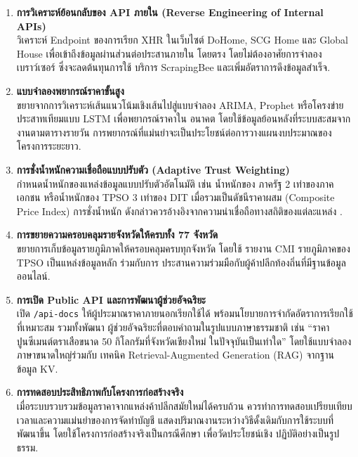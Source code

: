\begin{enumerate}[leftmargin=2em,itemsep=0.3em]
  \item \textbf{การวิเคราะห์ย้อนกลับของ API ภายใน (Reverse Engineering
        of Internal APIs)}\\
        วิเคราะห์ Endpoint ของการเรียก XHR ในเว็บไซต์ DoHome, SCG Home
        และ Global House เพื่อเข้าถึงข้อมูลผ่านส่วนต่อประสานภายใน
        โดยตรง โดยไม่ต้องอาศัยการจำลองเบราว์เซอร์ ซึ่งจะลดต้นทุนการใช้
        บริการ ScrapingBee และเพิ่มอัตราการดึงข้อมูลสำเร็จ.

  \item \textbf{แบบจำลองพยากรณ์ราคาขั้นสูง}\\
        ขยายจากการวิเคราะห์เส้นแนวโน้มเชิงเส้นไปสู่แบบจำลอง ARIMA,
        Prophet หรือโครงข่ายประสาทเทียมแบบ LSTM เพื่อพยากรณ์ราคาใน
        อนาคต โดยใช้ข้อมูลย้อนหลังที่ระบบสะสมจากงานตามตารางรายวัน
        การพยากรณ์ที่แม่นยำจะเป็นประโยชน์ต่อการวางแผนงบประมาณของ
        โครงการระยะยาว.

  \item \textbf{การชั่งน้ำหนักความเชื่อถือแบบปรับตัว (Adaptive Trust
        Weighting)}\\
        กำหนดน้ำหนักของแหล่งข้อมูลแบบปรับตัวอัตโนมัติ เช่น น้ำหนักของ
        ภาครัฐ 2 เท่าของภาคเอกชน หรือน้ำหนักของ TPSO 3 เท่าของ DIT
        เมื่อรวมเป็นดัชนีราคาผสม (Composite Price Index) การชั่งน้ำหนัก
        ดังกล่าวควรอ้างอิงจากความน่าเชื่อถือทางสถิติของแต่ละแหล่ง
        \cite{elmohr2022}.

  \item \textbf{การขยายความครอบคลุมรายจังหวัดให้ครบทั้ง 77 จังหวัด}\\
        ขยายการเก็บข้อมูลรายภูมิภาคให้ครอบคลุมครบทุกจังหวัด โดยใช้
        รายงาน CMI รายภูมิภาคของ TPSO เป็นแหล่งข้อมูลหลัก ร่วมกับการ
        ประสานความร่วมมือกับผู้ค้าปลีกท้องถิ่นที่มีฐานข้อมูลออนไลน์.

  \item \textbf{การเปิด Public API และการพัฒนาผู้ช่วยอัจฉริยะ}\\
        เปิด \texttt{/api-docs} ให้ผู้ประมาณราคาภายนอกเรียกใช้ได้
        พร้อมนโยบายการจำกัดอัตราการเรียกใช้ที่เหมาะสม รวมทั้งพัฒนา
        ผู้ช่วยอัจฉริยะที่ตอบคำถามในรูปแบบภาษาธรรมชาติ เช่น
        ``ราคาปูนซีเมนต์ตราเสือขนาด 50 กิโลกรัมที่จังหวัดเชียงใหม่
        ในปัจจุบันเป็นเท่าใด'' โดยใช้แบบจำลองภาษาขนาดใหญ่ร่วมกับ
        เทคนิค Retrieval-Augmented Generation (RAG) จากฐานข้อมูล KV.

  \item \textbf{การทดสอบประสิทธิภาพกับโครงการก่อสร้างจริง}\\
        เมื่อระบบรวบรวมข้อมูลราคาจากแหล่งค้าปลีกสมัยใหม่ได้ครบถ้วน
        ควรทำการทดสอบเปรียบเทียบเวลาและความแม่นยำของการจัดทำบัญชี
        แสดงปริมาณงานระหว่างวิธีดั้งเดิมกับการใช้ระบบที่พัฒนาขึ้น
        โดยใช้โครงการก่อสร้างจริงเป็นกรณีศึกษา เพื่อวัดประโยชน์เชิง
        ปฏิบัติอย่างเป็นรูปธรรม.
\end{enumerate}

